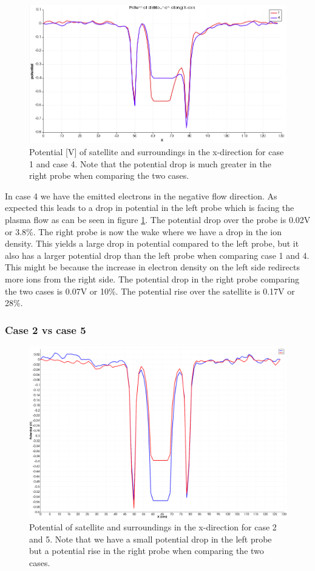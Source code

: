 \begin{figure}
    \centering
    \includegraphics[width = 0.6 \textwidth]{images/pot_case14.png}
    \caption{Potential [V] of satellite and surroundings in the x-direction for case 1 and case 4. Note that the potential drop is much greater in the right probe when comparing the two cases.}
    \label{fig:pot_case14}
\end{figure}


In case 4 we have the emitted electrons in the negative flow direction. As expected this
leads to a drop in potential in the left probe which is facing the plasma flow as can be seen in figure \ref{fig:pot_case14}. The
potential drop over the probe is 0.02V or 3.8\%. The right probe is now the wake where we have
a drop in the ion density. This yields a large drop in potential compared to the left
probe, but it also has a larger potential drop than the left probe when comparing case 1 and 4. This
might be because the increase in electron density on the left side redirects more ions from the right side.
The potential drop in the right probe comparing the two cases is 0.07V or 10\%. The potential rise over the satellite is 0.17V or 28\%.


\subsubsection{Case 2 vs case 5}
\begin{figure}
    \centering
    \includegraphics[width = 0.6 \textwidth]{images/pot_case25_new2.png}
    \caption{Potential of satellite and surroundings in the x-direction for case 2 and 5. Note that we have a small potential drop in the left probe but a potential rise in the right probe when comparing the two cases.}
    \label{fig:pot_case25}
\end{figure}

